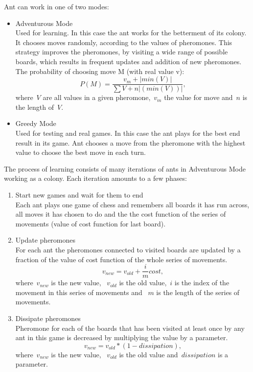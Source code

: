 \documentclass[pdftex]{article}
\begin{document}
 Ant can work in one of two modes: 
\begin{itemize}
 	\item Adventurous Mode \hfill \\
		Used for learning. In this case the ant works for the betterment of its colony. It chooses moves randomly, according to the values of pheromones. This strategy improves the pheromones, by visiting a wide range of possible boards, which results in frequent updates and addition of new pheromones. The probability of choosing move M (with real value v):
$$P(M) = \frac{v_m + |min(V)|}{\sum V + n|(min(V))|}, $$
where~$V$ are all values in a given pheromone,~$v_m$ the value for move and~$n$ is the length of~$V$.

	\item Greedy Mode \hfill \\
		Used for testing and real games. In this case the ant plays for the best end result in its game. Ant chooses a move from the pheromone with the highest value to choose the best move in each turn.
\end{itemize}

The process of learning consists of many iterations of ants in Adventurous Mode working as a colony. Each iteration amounts to a few phases:
\begin{enumerate}
 	\item Start new games and wait for them to end \hfill \\
		Each ant plays one game of chess and remembers all boards it has run across, all moves it has chosen to do and the
the cost function of the series of movements (value of cost function for last board).
	\item Update pheromones \hfill \\
		For each ant the pheromones connected to visited boards are updated by a fraction of the value of cost function of the whole series of movements.
$$v_{new} = v_{old} + \frac{i}{m} cost,$$
where~$v_{new}$ is the new value, ~$v_{old}$ is the old value,~$i$ is the index of the movement in this series of movements and ~$m$ is the length of the series of movements.
	\item Dissipate pheromones \hfill \\
		Pheromone for each of the boards that has been visited at least once by any ant in this game is decreased by multiplying the value by a parameter.
$$v_{new} =  v_{old} *  (1 - dissipation),$$
where~$v_{new}$ is the new value, ~$v_{old}$ is the old value and~$dissipation$ is a parameter. 

\end{enumerate}
\end{document}
